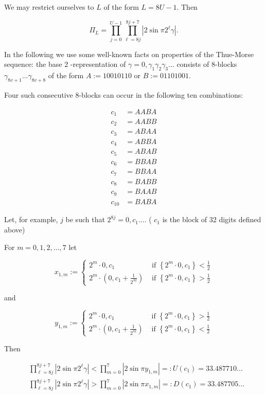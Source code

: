 \documentclass[10pt]{article}
\begin{document}
We may restrict ourselves to $L$ of the form $L=8 U-1$. Then

$$
\Pi_{L}=\prod_{j=0}^{U-1} \prod_{\ell=8 j}^{8 j+7}\left|2 \sin \pi 2^{\ell} \gamma\right| .
$$

In the following we use some well-known facts on properties of the Thue-Morse sequence: the base 2 -representation of $\gamma=0, \gamma_{1} \gamma_{2} \gamma_{3} \ldots$ consists of 8-blocks $\gamma_{8 v+1} \ldots \gamma_{8 v+8}$ of the form $A:=10010110$ or $B:=01101001$.

Four such consecutive 8-blocks can occur in the following ten combinations:

$$
\begin{aligned}
c_{1} & =A A B A \\
c_{2} & =A A B B \\
c_{3} & =A B A A \\
c_{4} & =A B B A \\
c_{5} & =A B A B \\
c_{6} & =B B A B \\
c_{7} & =B B A A \\
c_{8} & =B A B B \\
c_{9} & =B A A B \\
c_{10} & =B A B A
\end{aligned}
$$

Let, for example, $j$ be such that $2^{8 j}=0, c_{1} \ldots$. ( $c_{1}$ is the block of 32 digits defined above)

For $m=0,1,2, \ldots, 7$ let

$$
x_{1, m}:= \begin{cases}2^{m} \cdot 0, c_{1} & \text { if }\left\{2^{m} \cdot 0, c_{1}\right\}<\frac{1}{2} \\ 2^{m} \cdot\left(0, c_{1}+\frac{1}{2^{32}}\right) & \text { if }\left\{2^{m} \cdot 0, c_{1}\right\}>\frac{1}{2}\end{cases}
$$

and

$$
y_{1, m}:= \begin{cases}2^{m} \cdot 0, c_{1} & \text { if }\left\{2^{m} \cdot 0, c_{1}\right\}>\frac{1}{2} \\ 2^{m} \cdot\left(0, c_{1}+\frac{1}{2^{32}}\right) & \text { if }\left\{2^{m} \cdot 0, c_{1}\right\}<\frac{1}{2}\end{cases}
$$

Then

$$
\begin{aligned}
& \prod_{\ell=8 j}^{8 j+7}\left|2 \sin \pi 2^{\ell} \gamma\right|<\prod_{m=0}^{7}\left|2 \sin \pi y_{1, m}\right|=: U\left(c_{1}\right)=33.487710 \ldots \\
& \prod_{\ell=8 j}^{8 j+7}\left|2 \sin \pi 2^{\ell} \gamma\right|>\prod_{m=0}^{7}\left|2 \sin \pi x_{1, m}\right|=: D\left(c_{1}\right)=33.487705 \ldots
\end{aligned}
$$
\end{document}
